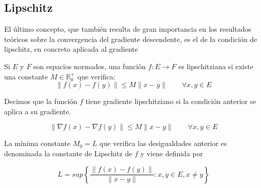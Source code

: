 \begin{comment}
	
	\begin{definicion}[Función estrictamente convexa]
	    Sea $E \subset \mathbb{R}^n$ un conjunto convexo no vacío y sea $f:E \rightarrow \mathbb{R}$, $f$ es una función convexa en $E$ si, y solo si:
	
	    $$f(tx + (1-t)y) < tf(x) + (1-t) f(y), \quad \forall t \in ]0,1[, \forall x,y \in E, x \neq y$$
	\end{definicion}
	
	\begin{definicion}[Función fuertemente convexa]
	    Sea $E \subset \mathbb{R}^n$ un conjunto convexo no vacío y sea $f:E \rightarrow \mathbb{R}$, $f$ es una función fuertemente convexa en $E$ con módulo $c>0$ si :
	
	    $$f(tx + (1-t)y) \leq tf(x) + (1-t) f(y) - \frac{c}{2}t(1-t)\|x-y\|^2, \quad \forall t \in [0,1], \forall x,y \in E$$
	\end{definicion}
\end{comment}


\subsection{Lipschitz}

El último concepto, que también resulta de gran importancia en los resultados teóricos sobre la convergencia del gradiente descendente, es el de la condición de lipschitz, en concreto aplicada al gradiente

\begin{definicion}
    Si $E$ y $F$ son espacios normados, una función $f:E \rightarrow F$ es lipschitziana si existe una constante $M \in \mathbb{R}_0^+$ que verifica:
    $$ \| f(x) - f(y) \| \leq M \| x - y \| \qquad \forall x,y \in E$$
\end{definicion}

Decimos que la función $f$ tiene gradiente lipschitziano si la condición anterior se aplica a su gradiente.

$$\| \nabla f(x) - \nabla f(y) \| \leq M \| x - y \| \qquad \forall x,y \in E $$


La mínima constante $M_0=L$ que verifica las desigualdades anterior es denominada la constante de Lipschitz de $f$ y viene definida por 

$$L=sup \left \{ \frac{\|f(x)-f(y)\|}{\|x - y \|} : x,y \in E, x \neq y \right \}$$

